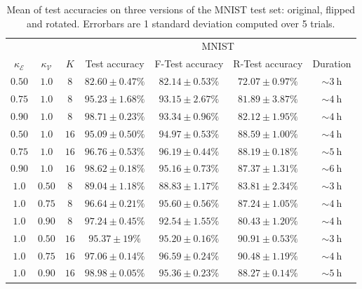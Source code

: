 \documentclass{article}
\begin{document}
\begin{table}[h!]
\label{table:equivariance_leaking_results}
\centering 
\caption{Mean of test accuracies on three versions of the MNIST test set: original, flipped and rotated. Errorbars are 1 standard deviation computed over 5 trials.}
\begin{tabular}{c c c c c c c}
\toprule
& & & \multicolumn{4}{c}{MNIST} \\
$\kappa_{\mathcal{E}}$ & $\kappa_{\mathcal{V}}$ & $K$ & Test accuracy & F-Test accuracy & R-Test accuracy & Duration\\
\midrule
$0.50$ & $1.0$ & $8$ & $82.60 \pm 0.47 \%$ & $82.14 \pm 0.53 \%$ & $72.07 \pm 0.97 \%$ & $\sim \SI{3}{\hour}$ \\
$0.75$ & $1.0$ & $8$ & $95.23 \pm 1.68 \%$ & $93.15 \pm 2.67 \%$ & $81.89 \pm 3.87 \%$ & $\sim \SI{4}{\hour}$ \\
$0.90$ & $1.0$ & $8$ & $98.71 \pm 0.23 \%$ & $93.34 \pm 0.96 \%$ & $82.12 \pm 1.95 \%$ & $\sim \SI{4}{\hour}$ \\
$0.50$ & $1.0$ & $16$ & $95.09 \pm 0.50 \%$ & $94.97 \pm 0.53 \%$ & $88.59 \pm 1.00 \%$ & $\sim \SI{4}{\hour}$ \\
$0.75$ & $1.0$ & $16$ & $96.76 \pm 0.53 \%$ & $\boldsymbol{96.19 \pm 0.44 \%}$ & $\boldsymbol{88.19 \pm 0.18 \%}$ & $\sim \SI{5}{\hour}$ \\
$0.90$ & $1.0$ & $16$ & $98.62 \pm 0.18 \%$ & $95.16 \pm 0.73 \%$ & $87.37 \pm 1.31 \%$ & $\sim \SI{6}{\hour}$ \\
\midrule
$1.0$ & $0.50$ & $8$ & $89.04 \pm 1.18 \%$ & $88.83 \pm 1.17 \%$ & $83.81 \pm 2.34 \%$ & $\sim \SI{3}{\hour}$ \\
$1.0$ & $0.75$ & $8$ & $96.64 \pm 0.21 \%$ & $95.60 \pm 0.56 \%$ & $87.24 \pm 1.05 \%$ & $\sim \SI{4}{\hour}$ \\
$1.0$ & $0.90$ & $8$ & $97.24 \pm 0.45 \%$ & $92.54 \pm 1.55 \%$ & $80.43 \pm 1.20 \%$ & $\sim \SI{4}{\hour}$ \\
$1.0$ & $0.50$ & $16$ & $95.37 \pm 19 \%$ & $95.20 \pm 0.16 \%$ & $\boldsymbol{90.91 \pm 0.53 \%}$ & $\sim \SI{3}{\hour}$ \\
$1.0$ & $0.75$ & $16$ & $97.06 \pm 0.14 \%$ & $\boldsymbol{96.59 \pm 0.24 \%}$ & $90.48 \pm 1.19 \%$ & $\sim \SI{4}{\hour}$ \\
$1.0$ & $0.90$ & $16$ & $98.98 \pm 0.05 \%$ & $95.36 \pm 0.23 \%$ & $88.27 \pm 0.14 \%$ & $\sim \SI{5}{\hour}$ \\
\bottomrule
\end{tabular}
\end{table}
\end{document}
